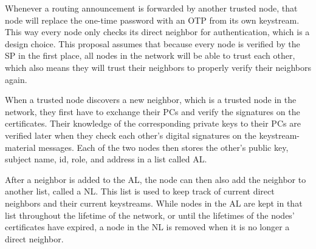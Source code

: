 Whenever a routing announcement is forwarded by another trusted node, that
node will replace the one-time password with an \ac{OTP} from its own keystream.
This way every node only checks its direct neighbor for authentication, which is
a design choice. This proposal assumes that because every node is verified by
the \ac{SP} in the first place, all nodes in the network will be able to trust
each other, which also means they will trust their neighbors to properly verify
their neighbors again.


When a trusted node discovers a new neighbor, which is a trusted node in the
network, they first have to exchange their \acp{PC} and verify the signatures
on the certificates. Their knowledge of the corresponding private keys to their
\acp{PC} are verified later when they check each other's digital signatures on
the keystream-material messages. Each of the two nodes then stores the other's
public key, subject name, id, role, and address in a list called \ac{AL}.


After a neighbor is added to the \ac{AL}, the node can then also add the
neighbor to another list, called a \ac{NL}. This list is used to keep
track of current direct neighbors and their current keystreams. While nodes in
the \ac{AL} are kept in that list throughout the lifetime of the network, or
until the lifetimes of the nodes' certificates have expired, a node in the
\ac{NL} is removed when it is no longer a direct neighbor. 

